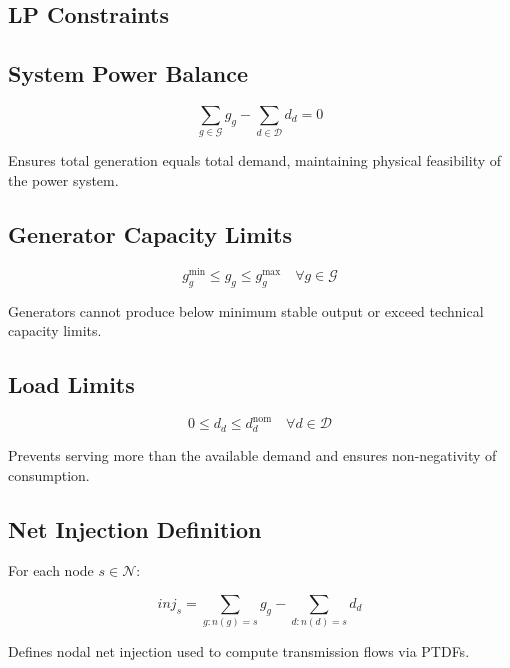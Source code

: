 \documentclass[11pt]{article}
\begin{document}
\subsection{LP Constraints}

\subsection{System Power Balance}

\begin{equation}
\sum_{g \in \mathcal{G}} g_g
-
\sum_{d \in \mathcal{D}} d_d
= 0
\end{equation}

 
Ensures total generation equals total demand, maintaining physical feasibility of the power system.

\subsection{Generator Capacity Limits}

\begin{equation}
g_g^{\min} \le g_g \le g_g^{\max}
\quad \forall g \in \mathcal{G}
\end{equation}

 
Generators cannot produce below minimum stable output or exceed technical capacity limits.

\subsection{Load Limits}

\begin{equation}
0 \le d_d \le d_d^{\text{nom}}
\quad \forall d \in \mathcal{D}
\end{equation}

 
Prevents serving more than the available demand and ensures non-negativity of consumption.

\subsection{Net Injection Definition}

For each node $s \in \mathcal{N}$:

\begin{equation}
inj_s =
\sum_{g: n(g)=s} g_g
-
\sum_{d: n(d)=s} d_d
\end{equation}

 
Defines nodal net injection used to compute transmission flows via PTDFs.
\end{document}
